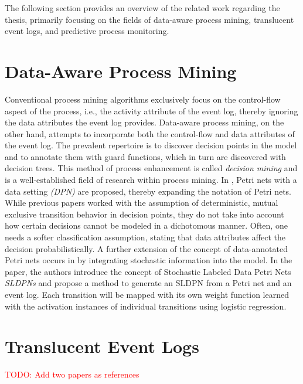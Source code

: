 The following section provides an overview of the related work regarding the thesis, primarily focusing on the fields of data-aware process mining, translucent event logs, and predictive process monitoring.

\section{Data-Aware Process Mining}

Conventional process mining algorithms exclusively focus on the control-flow aspect of the process, i.e., the activity attribute of the event log, thereby ignoring the data attributes the event log provides. Data-aware process mining, on the other hand, attempts to incorporate both the control-flow and data attributes of the event log. The prevalent repertoire is to discover decision points in the model and to annotate them with guard functions, which in turn are discovered with decision trees. This method of process enhancement is called \emph{decision mining} \cite{decision-mining-in-prom,decision-mining-in-business-processes,data-aware-process-mining} and is a well-established field of research within process mining. In \cite{data-aware-process-mining}, Petri nets with a data setting \emph{(DPN)} are proposed, thereby expanding the notation of Petri nets. While previous papers worked with the assumption of deterministic, mutual exclusive transition behavior in decision points, they do not take into account how certain decisions cannot be modeled in a dichotomous manner. Often, one needs a softer classification assumption, stating that data attributes affect the decision probabilistically. A further extension of the concept of data-annotated Petri nets occurs in \cite{sldpn} by integrating stochastic information into the model. In the paper, the authors introduce the concept of Stochastic Labeled Data Petri Nets \emph{SLDPNs} and propose a method to generate an SLDPN from a Petri net and an event log. Each transition will be mapped with its own weight function learned with the activation instances of individual transitions using logistic regression.

\section{Translucent Event Logs}

\textcolor{red}{TODO: Add two papers as references}

